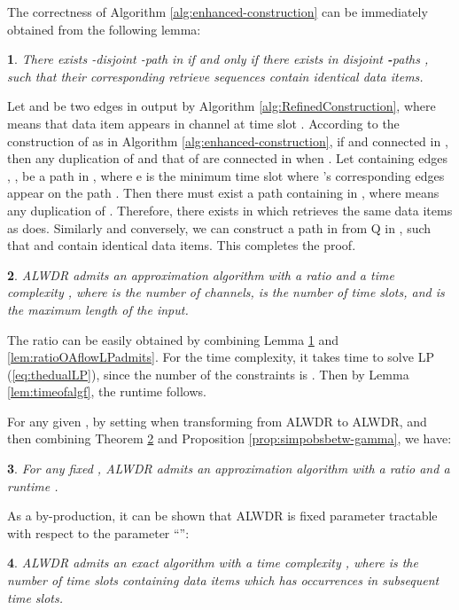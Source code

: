 \documentclass[11pt,english,onecolumn,draftcls]{IEEEtran}
\theoremstyle{plain}
\newtheorem{thm}{\protect\theoremname}
\theoremstyle{plain}
\theoremstyle{plain}
\newtheorem{lem}[thm]{\protect\lemmaname}
\theoremstyle{plain}
\newtheorem{cor}[thm]{\protect\corollaryname}
\providecommand{\corollaryname}{Corollary}
\providecommand{\lemmaname}{Lemma}
\providecommand{\theoremname}{Theorem}
\begin{document}
The correctness of Algorithm \ref{alg:enhanced-construction} can
be immediately obtained from the following lemma:
\begin{lem}
\label{lem:finalgra}There exists -disjoint -path 
in  if and only if there exists in   disjoint \textbf{-}paths
, such that their corresponding retrieve
sequences\textbf{ }contain identical data items.\end{lem}
\begin{IEEEproof}
Let  and  be two edges in  output by
Algorithm \ref{alg:RefinedConstruction}, where  means
that data item  appears in channel  at time slot .
According to the construction of  as in Algorithm \ref{alg:enhanced-construction},
if  and  connected in , then any duplication
of  and that of  are connected in 
when . Let  containing edges ,
, be a path in , where e  is the minimum
time slot where 's corresponding edges appear on the path
. Then there must exist a path  containing 
in , where  means any duplication
of . Therefore, there exists  in 
which retrieves the same data items 
as  does. Similarly and conversely, we can construct a path 
in  from Q in , such that  and  contain identical
data items. This completes the proof. \end{IEEEproof}
\begin{thm}
\label{thr:kagammaLWDR} ALWDR admits an approximation
algorithm with a ratio  and a time complexity ,
where  is the number of channels,  is the number of time slots,
and  is the maximum length of the input.\end{thm}
\begin{IEEEproof}
The ratio can be easily obtained by combining Lemma \ref{lem:finalgra}
and \ref{lem:ratioOAflowLPadmits}. For the time complexity, it takes
 time to solve LP (\ref{eq:thedualLP}),
since the number of the constraints is  \cite{korte2002combinatorial}.
Then by Lemma \ref{lem:timeofalgf}, the runtime 
follows.
\end{IEEEproof}
For any given , by setting 
when transforming from ALWDR to ALWDR,
and then combining Theorem \ref{thr:kagammaLWDR} and Proposition
\ref{prop:simpobsbetw-gamma}, we have:
\begin{thm}
\label{thm:finalratioforkLWDR}For any fixed , ALWDR
admits an approximation algorithm with a ratio 
and a runtime .
\end{thm}
As a by-production, it can be shown that ALWDR is fixed parameter
tractable with respect to the parameter ``'':
\begin{cor}
ALWDR admits an exact algorithm with a time complexity ,
where  is the number of time slots containing data items which
has occurrences in subsequent time slots.\end{cor}
\end{document}
